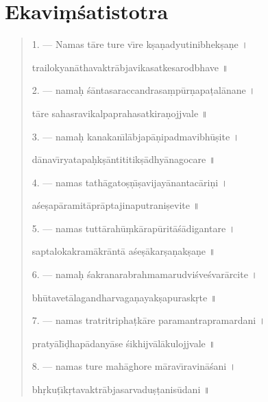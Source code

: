 \documentclass[a4paper, 11pt, oneside, french, landscape, twocolumn]{article}
\begin{document}
\section{Ekavi\d{m}\'{s}atistotra}
\begin{quotation}\footnotesize
1. --- Namas t\={a}re ture v\={\i}re k\d{s}a\d{n}adyutinibhek\d{s}a\d{n}e \texthindi{।}

trailokyan\={a}thavaktr\={a}bjavikasatkesarodbhave \texthindi{॥}

\bigskip

2. --- nama\d{h} \'{s}\={a}ntasaraccandrasa\d{m}p\={u}r\d{n}apa\d{t}al\={a}nane \texthindi{।}

t\={a}re sahasravikalpaprahasatkira\d{n}ojjvale \texthindi{॥}

\bigskip

3. --- nama\d{h} kanakan\={\i}l\={a}bjap\={a}\d{n}ipadmavibh\={u}\d{s}ite \texthindi{।}

d\={a}nav\={\i}ryatapa\d{h}k\d{s}\={a}ntititik\d{s}\={a}dhy\={a}nagocare \texthindi{॥}

\bigskip

4. --- namas tath\={a}gato\d{s}\d{n}\={\i}\d{s}avijay\={a}nantac\={a}ri\d{n}i \texthindi{।}

a\'{s}e\d{s}ap\={a}ramit\={a}pr\={a}ptajinaputrani\d{s}evite \texthindi{॥}

\bigskip

5. --- namas tutt\={a}rah\={u}\d{m}k\={a}rap\={u}rit\={a}\'{s}\={a}digantare \texthindi{।}

saptalokakram\={a}kr\={a}nt\={a} a\'{s}e\d{s}\={a}kar\d{s}a\d{n}ak\d{s}a\d{n}e \texthindi{॥}

\bigskip

6. --- nama\d{h} \'{s}akranarabrahmamarudvi\'{s}ve\'{s}var\={a}rcite \texthindi{।}

bh\={u}tavet\={a}lagandharvaga\d{n}ayak\d{s}apurask\d{r}te \texthindi{॥}

\bigskip

7. --- namas tratritripha\d{t}k\={a}re paramantrapramardani \texthindi{।}

praty\={a}l\={\i}\d{d}hap\={a}dany\={a}se \'{s}ikhijv\={a}l\={a}kulojjvale \texthindi{॥}

\bigskip

8. --- namas ture mah\={a}ghore m\={a}rav\={\i}ravin\={a}\'{s}ani \texthindi{।}

bh\d{r}ku\d{t}\={\i}k\d{r}tavaktr\={a}bjasarvadu\d{s}\d{t}anis\={u}dani \texthindi{॥}

\bigskip


\end{quotation}
\end{document}
